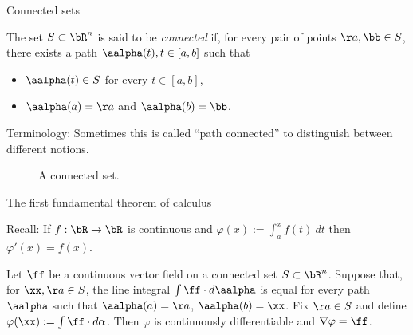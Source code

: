     {Connected sets}

    
    
        
            \begin{definition}[connected]
                The set \(S\subset \bR^n\) is said to be \emph{connected} if, for every pair of points \(\aa,\bb\in S\), there exists a path \(\aalpha(t), t\in[a,b]\) such that 
                \begin{itemize}
                    \item \(\aalpha(t)\in S\) for every \( t\in[a,b]\),
                    \item \(\aalpha(a)=\aa\) and \(\aalpha(b)=\bb\).
                \end{itemize}
            \end{definition}
        
            {Terminology:} Sometimes this is called ``path connected'' to distinguish between different notions.
        

        
            \begin{figure}
                \caption{A connected set.}
            \end{figure}
        
    
    




    {The first fundamental theorem of calculus}

    {Recall:}
    If \(f:\bR \to \bR\) is continuous and \(\varphi(x) := \int_a^x f(t) \ dt\) then \(\varphi'(x) = f(x)\).

    \begin{theorem}
        Let \(\ff\) be a continuous vector field on a connected set \(S \subset \bR^n\).
        Suppose that, for \(\xx,\aa\in S\), the line integral \(\int \ff \cdot d\aalpha\) is equal for every path \(\aalpha\) such that \(\aalpha(a)=\aa\), \(\aalpha(b)=\xx\).
        Fix \(\aa\in S\) and define \(\varphi(\xx):= \int \ff \cdot d\alpha\).
        Then \(\varphi\) is continuously differentiable and \(\nabla \varphi = \ff\).
    \end{theorem}

